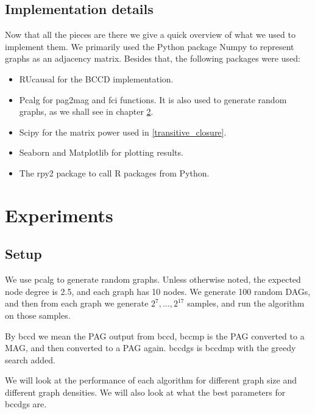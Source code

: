\documentclass[11pt,a4paper]{report}
\theoremstyle{definition}
\begin{document}
\section{Implementation details}
Now that all the pieces are there we give a quick overview of what we used
to implement them. We primarily used the Python package Numpy
\cite{harrisArrayProgrammingNumPy2020} to represent graphs as an adjacency
matrix. Besides that, the following packages were used:
\begin{itemize}
  \item RUcausal  for the BCCD implementation.

  \item Pcalg\cite{kalischCausalInferenceUsing2012} for pag2mag and fci
    functions. It is also used to generate random graphs, as we shall see
    in chapter \ref{results}.

  \item Scipy\cite{virtanenSciPyFundamentalAlgorithms2020} for the matrix
    power used in \ref{transitive_closure}.

  \item Seaborn\cite{waskomSeabornStatisticalData2021} and
    Matplotlib\cite{hunterMatplotlib2DGraphics2007} for plotting results.

  \item The rpy2 package to call R packages from Python.
\end{itemize}

\chapter{Experiments}\label{results}

\section{Setup}
We use pcalg to generate random graphs. Unless otherwise noted, the
expected node degree is 2.5, and each graph has 10 nodes. We generate 100
random DAGs, and then from each graph we generate $2^7, \ldots, 2^{17}$
samples, and run the algorithm on those samples.

By bccd we mean the PAG output from bccd, bccmp is the PAG converted to a
MAG, and then converted to a PAG again. bccdgs is bccdmp with the greedy
search added.

We will look at the performance of each algorithm for different graph
size and different graph densities. We will also look at what the best
parameters for bccdgs are.
\end{document}
